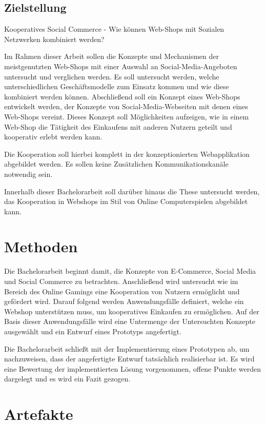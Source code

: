 \subsection{Zielstellung}

Kooperatives Social Commerce
- Wie können Web-Shops mit Sozialen Netzwerken kombiniert werden?

Im Rahmen dieser Arbeit sollen die Konzepte und Mechanismen der meistgenutzten Web-Shops mit einer Auswahl an Social-Media-Angeboten untersucht und verglichen werden. Es soll untersucht werden, welche unterschiedlichen Geschäftsmodelle zum Einsatz kommen und wie diese kombiniert werden können. Abschließend soll ein Konzept eines Web-Shops entwickelt werden, der Konzepte von Social-Media-Webseiten mit denen eines Web-Shops vereint. Dieses Konzept soll Möglichkeiten aufzeigen, wie in einem Web-Shop die Tätigkeit des Einkaufens mit anderen Nutzern geteilt und kooperativ erlebt werden kann.

Die Kooperation soll hierbei komplett in der konzeptionierten Webapplikation abgebildet werden. Es sollen keine Zusätzlichen Kommunikationskanäle notwendig sein.

Innerhalb dieser Bachelorarbeit soll darüber hinaus die These untersucht werden, das Kooperation in Webshops im Stil von Online Computerspielen abgebildet kann.


\section{Methoden}

Die Bachelorarbeit beginnt damit, die Konzepte von E-Commerce, Social Media und Social Commerce zu betrachten. Anschließend wird untersucht wie im Bereich des Online Gamings eine Kooperation von Nutzern ermöglicht und gefördert wird. Darauf folgend werden Anwendungsfälle definiert, welche ein Webshop unterstützen muss, um kooperatives Einkaufen zu ermöglichen. Auf der Basis dieser Anwendungsfälle wird eine Untermenge der Untersuchten Konzepte ausgewählt und ein Entwurf eines Prototyps angefertigt.

Die Bachelorarbeit schließt mit der Implementierung eines Prototypen ab, um nachzuweisen, dass der angefertigte Entwurf tatsächlich realisierbar ist. Es wird eine Bewertung der implementierten Lösung vorgenommen, offene Punkte werden dargelegt und es wird ein Fazit gezogen.


\section{Artefakte}

